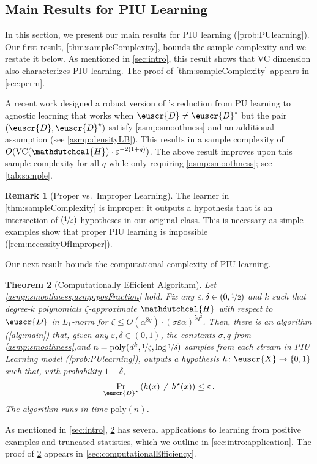 \documentclass[11pt]{article}
\theoremstyle{plain}
\newtheorem{theorem}{Theorem}[section]
\theoremstyle{definition}
\newtheorem{remark}[theorem]{Remark}
\theoremstyle{remark}
\newcommand{\inbrace}[1]{\left\{#1\right\}}
\newcommand{\inparen}[1]{\left(#1\right)}
\newcommand{\zo}{\ensuremath{\inbrace{0, 1}}}
\newcommand{\nfrac}[2]{\nicefrac{#1}{#2}}
\newcommand{\poly}{\mathrm{poly}}
\newcommand{\vc}{\textrm{\rm VC}}
\newcommand{\eps}{\varepsilon}
\newcommand{\customcal}[1]{\euscr{#1}}
\newcommand{\cD}{\customcal{D}}
\newcommand{\cX}{\customcal{X}}
\newcommand{\hypo}[1]{\mathdutchcal{#1}}
\newcommand{\hyH}{\hypo{H}}
\newcommand{\cDtrue}{\cD^\star}
\newcommand{\cDgiven}{\cD}
\newcommand{\nL}{L}
\begin{document}
    \subsection{Main Results for PIU Learning}\label{sec:mainresult}
        In this section, we present our main results for PIU learning (\cref{prob:PUlearning}). %
        Our first result, \cref{thm:sampleComplexity}, bounds the sample complexity and we restate it below.  
        \sampleComplexity*
        \noindent As mentioned in \cref{sec:intro}, this result shows that VC dimension also characterizes PIU learning.
        The proof of \cref{thm:sampleComplexity} appears in \cref{sec:perm}.


        A recent work \cite{lee2024unknown} designed a robust version of \citet{denis1990positive}'s reduction from PU learning to agnostic learning that works when $\cD\neq \cDtrue$ but the pair $(\cD,\cDtrue)$ satisfy \cref{asmp:smoothness} and an additional assumption (see \cref{asmp:densityLB}).
        This results in a sample complexity of {$O(\vc{}(\hyH)\cdot \eps^{-2(1+q)})$}.
        The above result improves upon this sample complexity for all $q$ while only requiring \cref{asmp:smoothness}; see \cref{tab:sample}.

        \begin{remark}[Proper vs.\ Improper Learning]
            The learner in \cref{thm:sampleComplexity} is improper: it outputs a hypothesis that is an intersection of $(\nfrac{1}{\eps})$-hypotheses in our original class. 
            This is necessary as simple examples show that proper PIU learning is impossible (\cref{rem:necessityOfImproper}).
        \end{remark}


        
        
        \noindent Our next result bounds the computational complexity of PIU learning.
        \begin{theorem}[Computationally Efficient Algorithm]\label{thm:main}
            Let \cref{asmp:smoothness,asmp:posFraction} hold.
            Fix any $\eps,\delta\in (0,\nfrac{1}{2})$ and $k$ such that degree-$k$ polynomials $\zeta$-approximate $\hyH$ with respect to $\cDgiven$ in $\nL_1$-norm for $\zeta\leq O(\alpha^{8q})\cdot (\sigma\eps\alpha)^{5q^2}$.
            Then, there is an algorithm (\cref{alg:main}) that, given 
                any $\eps,\delta\in (0,1)$, 
                the constants $\sigma,q$ from \cref{asmp:smoothness},and 
                $n=\poly(d^k,\nfrac{1}{\zeta},\log{\nfrac{1}{\delta}})$ samples from each stream in PIU Learning model (\cref{prob:PUlearning}), 
            outputs a hypothesis ${h}\colon \cX\to\zo$ such that, with probability $1-\delta$, 
            \[
                \Pr_{\cDtrue}\inparen{{h}(x)\neq h^\star(x)}\leq \eps\,.
            \]
            The algorithm runs in time $\poly(n)$.
        \end{theorem}
        As mentioned in \cref{sec:intro}, \cref{thm:main} has several applications to learning from positive examples and truncated statistics, which we outline in \cref{sec:intro:application}. 
        The proof of \cref{thm:main} appears in \cref{sec:computationalEfficiency}.  
        
\end{document}

